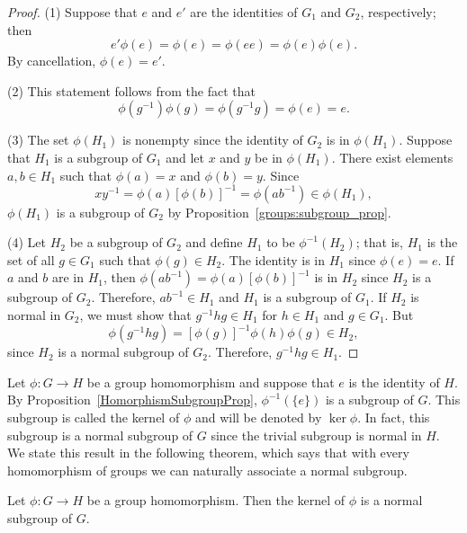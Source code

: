  
\begin{proof}
(1)
Suppose that $e$ and $e'$ are the identities of $G_1$ and $G_2$,
respectively; then
\[
e' \phi(e) = \phi(e) = \phi(e e) = \phi(e) \phi(e).
\]
By cancellation, $\phi(e) = e'$.
 
 
(2)
This statement follows from the fact that
\[
\phi( g^{-1}) \phi(g) = \phi(g^{-1} g) = \phi(e) = e.
\]
 
 
(3)
The set $\phi(H_1)$ is nonempty since the identity of $G_2$ is in
$\phi(H_1)$.
Suppose that $H_1$ is a subgroup of $G_1$ and let $x$ and $y$ be in
$\phi(H_1)$. There exist elements $a, b \in H_1$ such that $\phi(a) =
x$ and $\phi(b)=y$. Since 
\[
xy^{-1} = \phi(a)[ \phi(b)]^{-1} = \phi(a b^{-1} ) \in \phi(H_1),
\]
$\phi(H_1)$ is a subgroup of $G_2$ by Proposition~\ref{groups:subgroup_prop}.
 
 
(4)
Let $H_2$ be a subgroup of $G_2$ and define $H_1$ to be
$\phi^{-1}(H_2)$; that is, $H_1$ is the set of all $g \in G_1$ such
that $\phi(g) \in H_2$.  The identity is in $H_1$ since $\phi(e) = e$.
If $a$ and $b$ are in $H_1$, then $\phi(ab^{-1}) = \phi(a)[ \phi(b)
]^{-1}$ is in $H_2$ since $H_2$ is a subgroup of $G_2$.  Therefore,
$ab^{-1} \in H_1$ and $H_1$ is a subgroup of $G_1$. If $H_2$ is normal
in $G_2$, we must show that $g^{-1} h g \in H_1$ for $h \in H_1$ and
$g \in G_1$. But 
\[
\phi( g^{-1} h g) = [ \phi(g) ]^{-1} \phi( h ) \phi( g ) \in
H_2,
\]
since $H_2$ is a normal subgroup of $G_2$.  Therefore, $g^{-1}hg \in
H_1$.
\end{proof}
 
 
\medskip
 
 
Let $\phi : G \rightarrow H$ be a group homomorphism and suppose that
$e$ is the identity of $H$. By Proposition~\ref{HomorphismSubgroupProp}, $\phi^{-1} ( \{ e \}
)$ is a subgroup of $G$. This subgroup is called the {\bfi
kernel\/} of $\phi$ and will
be denoted by $\ker \phi$\label{kernelofphi}.  In fact, this subgroup
is a normal subgroup of $G$ since the trivial subgroup is normal in
$H$.  We state this result in the following theorem, which says that
with every homomorphism of groups we can naturally associate a normal
subgroup.   
 
 
\begin{theorem}
Let $\phi : G \rightarrow H$ be a group homomorphism. Then the kernel
of $\phi$ is a normal subgroup of $G$. 
\end{theorem}
 
